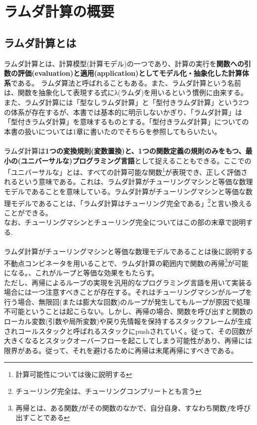 \chapter{ラムダ計算の概要}{
	\section{ラムダ計算とは}{
		ラムダ計算とは、計算模型(計算モデル)の一つであり、計算の実行を{\bf 関数への引数の評価(evaluation)と適用(application)としてモデル化・抽象化した計算体系}である。
		ラムダ算法と呼ばれることもある。また、ラムダ計算という名前は、関数を抽象化して表現する式にλ(ラムダ)を用いるという慣例に由来する。
		また、ラムダ計算には「型なしラムダ計算」と「型付きラムダ計算」という2つの体系が存在するが、本書では基本的に明示しないかぎり、「ラムダ計算」は「型付きラムダ計算」を意味するものとする。「型付きラムダ計算」についての本書の扱いについては1章に書いたのでそちらを参照してもらいたい。\\
		\\
		ラムダ計算は{\bf 1つの変換規則(変数置換)と、1つの関数定義の規則のみをもつ、最小の(ユニバーサルな)プログラミング言語}として捉えることもできる。ここでの「ユニバーサルな」とは、すべての計算可能な関数\footnote{計算可能性については後に説明する}が表現でき、正しく評価されるという意味である。これは、ラムダ計算がチューリングマシンと等価な数理モデルであることを意味している。ラムダ計算がチューリングマシンと等価な数理モデルであることは、「ラムダ計算はチューリング完全である」\footnote{チューリング完全は、チューリングコンプリートとも言う}と言い換えることができる。\\
		なお、チューリングマシンとチューリング完全についてはこの部の末章で説明する. \\
		\\
		ラムダ計算がチューリングマシンと等価な数理モデルであることは後に説明する不動点コンビネータを用いることで、ラムダ計算の範囲内で関数の再帰\footnote{再帰とは、ある関数$f$がその関数のなかで、自分自身、すなわち関数$f$を呼び出すことである}が可能になる。、これがループと等価な効果をもたらす。\\
		ただし、再帰によるループの実現を汎用的なプログラミング言語を用いて実装る場合には一つ注意すべきことが存在する。それはチューリングマシンがループを行う場合、無限回(または膨大な回数)のループが発生してもループが原因で処理不可能ということは起こらない。しかし、再帰の場合、関数を呼び出すと関数のローカル変数(引数や局所変数)や戻り先情報を保持するスタックフレームが生成されコールスタックと呼ばれるスタックにpushされていく。従って、その回数が大きくなるとスタックオーバーフローを起こしてしまう可能性があり、再帰には限界がある。従って、それを避けるために再帰は末尾再帰にすべきである。
	}

}

